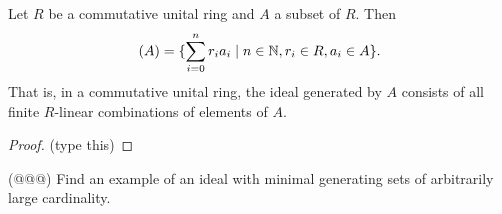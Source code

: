 \begin{prop}
Let \(R\) be a commutative unital ring and \(A\) a subset of \(R\). Then \[ (A) = \{ \sum_{i=0}^n r_ia_i \mid n \in \mathbb{N}, r_i \in R, a_i \in A \}. \] That is, in a commutative unital ring, the ideal generated by \(A\) consists of all finite \(R\)-linear combinations of elements of \(A\).
\end{prop}

\begin{proof}
(type this)
\end{proof}



\Exercises%

\begin{exercise}
(@@@) Find an example of an ideal with minimal generating sets of arbitrarily large cardinality.
\end{exercise}
